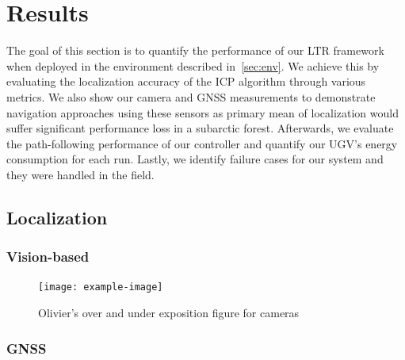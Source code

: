 \section{Results}
\label{sec:results}

The goal of this section is to quantify the performance of our \ac{LTR} framework when deployed in the environment described in~\autoref{sec:env}.
We achieve this by evaluating the localization accuracy of the \ac{ICP} algorithm through various metrics.
We also show our camera and \ac{GNSS} measurements to demonstrate navigation approaches using these sensors as primary mean of localization would suffer significant performance loss in a subarctic forest.
Afterwards, we evaluate the path-following performance of our controller and quantify our \ac{UGV}'s energy consumption for each run.
Lastly, we identify failure cases for our system and they were handled in the field.

\subsection{Localization}
\label{sec:res_loc}

\lightlipsum[1]

\subsubsection{Vision-based}
\label{sec:res_vis}

\lightlipsum[1]

\begin{figure} [htpb]
	\centering
	\texttt{[image: example-image]}
	\caption{Olivier's over and under exposition figure for cameras}
	\label{fig:cameras_expo}
\end{figure}

\subsubsection{GNSS}
\label{sec:res_gnss}

\lightlipsum[1]

